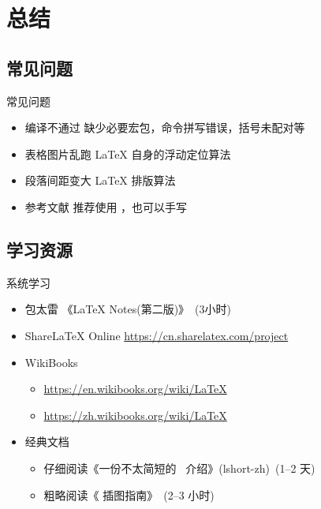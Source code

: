 \section{总结}

\subsection{常见问题}

\begin{frame}{常见问题}
  \begin{itemize}
    \item \alert{编译不通过} 缺少必要宏包，命令拼写错误，括号未配对等
    \item \alert{表格图片乱跑} \LaTeX{} 自身的浮动定位算法
    \item \alert{段落间距变大} \LaTeX{} 排版算法
    \item \alert{参考文献} 推荐使用 \BibTeX{}，也可以手写 
  \end{itemize}
\end{frame}

\subsection{学习资源}

\begin{frame}{系统学习}
  \begin{itemize}
      \item 包太雷 《\LaTeX{} Notes(第二版)》~(3小时)
      \item ShareLaTeX Online \url{https://cn.sharelatex.com/project}
      \item WikiBooks
        \begin{itemize}
          \item \url{https://en.wikibooks.org/wiki/LaTeX}
          \item \url{https://zh.wikibooks.org/wiki/LaTeX}
        \end{itemize}
      \item 经典文档
        \begin{itemize}
          \item 仔细阅读《一份不太简短的~\LaTeXe{} 介绍》(lshort-zh)~(1--2 天)
          \item 粗略阅读《\LaTeXe{} 插图指南》~(2--3 小时)
        \end{itemize}
  \end{itemize}
\end{frame}

